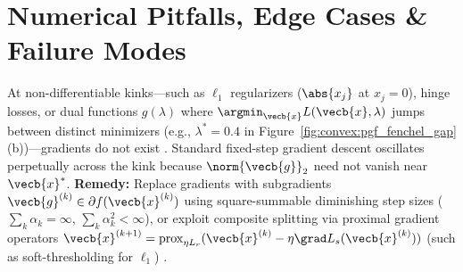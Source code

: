 \documentclass[../../../../master.tex]{subfiles}
\begin{document}
\section{Numerical Pitfalls, Edge Cases \& Failure Modes}
\label{sec:convex:pitfalls}

\begin{pitfall}
At non-differentiable kinks---such as $\ell_1$ regularizers ($\abs{x_j}$ at $x_j = 0$), hinge losses, or dual functions $g(\lambda)$ where $\argmin_{\vecb{x}} L(\vecb{x}, \lambda)$ jumps between distinct minimizers (e.g., $\lambda^* = 0.4$ in Figure~\ref{fig:convex:pgf_fenchel_gap}(b))---gradients do not exist . Standard fixed-step gradient descent oscillates perpetually across the kink because $\norm{\vecb{g}}_2$ need not vanish near $\vecb{x}^*$.
\textbf{Remedy:} Replace gradients with subgradients $\vecb{g}^{(k)} \in \partial f(\vecb{x}^{(k)})$ using square-summable diminishing step sizes ($\sum_k \alpha_k = \infty$, $\sum_k \alpha_k^2 < \infty$), or exploit composite splitting via proximal gradient operators $\vecb{x}^{(k+1)} = \operatorname{prox}_{\eta L_r}(\vecb{x}^{(k)} - \eta\grad L_s(\vecb{x}^{(k)}))$ (such as soft-thresholding for $\ell_1$) .
\end{pitfall}
\end{document}
